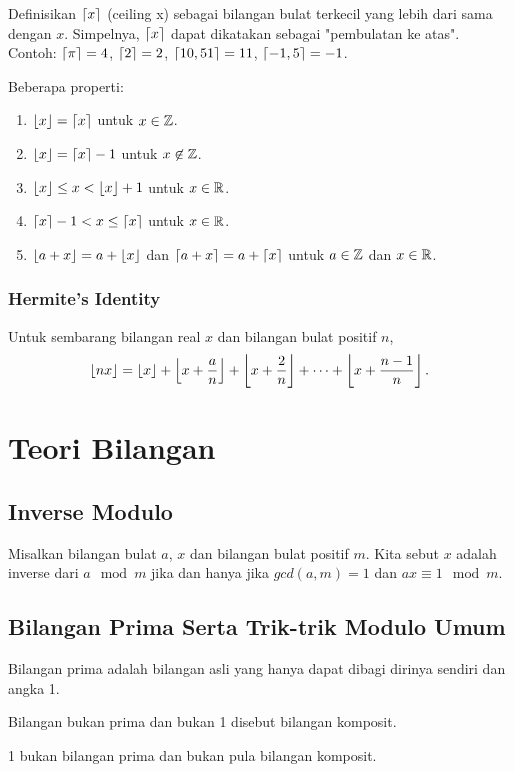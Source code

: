     Definisikan $\left\lceil x \right\rceil$ (ceiling x) sebagai bilangan bulat terkecil yang lebih dari sama dengan $x$. Simpelnya, $\left\lceil x \right\rceil$ dapat dikatakan sebagai "pembulatan ke atas". Contoh: $\left\lceil \pi \right\rceil=4$, $\left\lceil 2 \right\rceil=2$, $\left\lceil 10,51 \right\rceil=11$, $\left\lceil -1,5 \right\rceil=-1$.
    
    Beberapa properti:
    \begin{enumerate}
        \item $\left\lfloor x \right\rfloor=\left\lceil x \right\rceil$ untuk $x \in \mathbb Z$.
        \item $\left\lfloor x \right\rfloor=\left\lceil x \right\rceil-1$ untuk $x \not \in \mathbb Z$.
        \item $\left\lfloor x \right\rfloor \le  x < \left\lfloor x \right\rfloor+1$ untuk $x \in \mathbb R$.
        \item $\left\lceil x \right\rceil-1 < x \le \left\lceil x \right\rceil$ untuk $x \in \mathbb R$.
        \item $\left\lfloor a+x \right\rfloor=a+\left\lfloor x \right\rfloor$ dan $\left\lceil a+x \right\rceil=a+\left\lceil x \right\rceil$ untuk $a\in \mathbb Z$ dan $x \in \mathbb R$.
    \end{enumerate}
    
    \subsubsection{Hermite's Identity}
    Untuk sembarang bilangan real $x$ dan bilangan bulat positif $n$,
    $$\left\lfloor nx \right\rfloor=\left\lfloor x \right\rfloor+\left\lfloor x+\dfrac{a}{n} \right\rfloor+\left\lfloor x+\dfrac{2}{n} \right\rfloor+\dots+\left\lfloor x+\dfrac{n-1}{n} \right\rfloor.$$

    
    \section{Teori Bilangan}
    \subsection{Inverse Modulo}
    Misalkan bilangan bulat $a$, $x$ dan bilangan bulat positif $m$. Kita sebut $x$ adalah inverse dari $a \mod m$ jika dan hanya jika $gcd(a,m)=1$ dan $ax \equiv 1 \mod m$.
    
    \subsection{Bilangan Prima Serta Trik-trik Modulo Umum}
    Bilangan prima adalah bilangan asli yang hanya dapat dibagi dirinya sendiri dan angka 1. 
    
    Bilangan bukan prima dan bukan 1 disebut bilangan komposit.
    
    1 bukan bilangan prima dan bukan pula bilangan komposit. 
    
